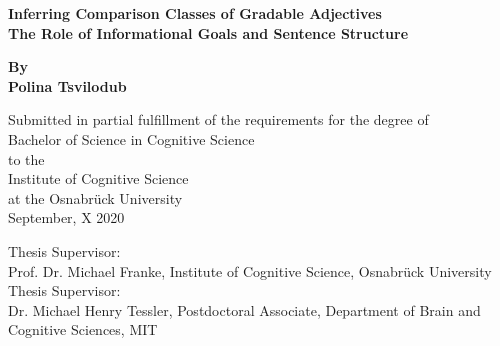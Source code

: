 \begin{titlepage}
	\begin{center}
		\vspace*{1cm}
		\Huge
		\textbf{Inferring Comparison Classes of Gradable Adjectives\\} 
		\vspace{0.5cm}
		\Large
		\textbf{The Role of Informational Goals and Sentence Structure}
		
		\vspace{1cm}
		
		\Large
		\textbf{By \\ Polina Tsvilodub}
		
		\vspace{1cm}
		Submitted in partial fulfillment of the requirements for the degree of \\
		Bachelor of Science in Cognitive Science \\ to the \\
		Institute of Cognitive Science \\ at the Osnabrück University\\
		September, X 2020
		
		\vspace{1cm}
		Thesis Supervisor:\\ Prof. Dr. Michael Franke, Institute of Cognitive Science, Osnabrück University \\
		Thesis Supervisor:\\ Dr. Michael Henry Tessler, Postdoctoral Associate, Department of Brain and Cognitive Sciences, MIT  
		
		
		
	\end{center}
\end{titlepage}